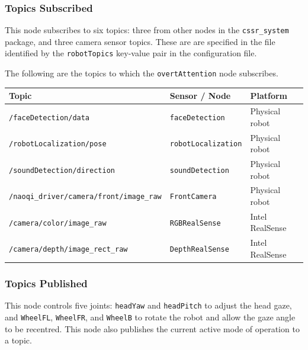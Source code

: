 \documentclass{CSSRforAfrica}
\begin{document}
{{\newpage

\subsubsection*{Topics Subscribed}
This node  subscribes to six topics:  three from other nodes in the  {\small \verb+cssr_system+} package,  and three camera sensor topics. 
These are are specified in the file identified by the {\small \verb+robotTopics+ }   key-value pair in the configuration file.

The following are the topics to which the {\small \verb+overtAttention+} node subscribes.

\begin{center}
\begin{tabularx}{\linewidth}{| l | l | X|}
\hline 
{\small Topic }                               & {\small Sensor / Node}                            &  {\small Platform}       \\
\hline
{\footnotesize \texttt{/faceDetection/data} }  & {\footnotesize \verb+faceDetection+}    & {\small Physical robot} \\ 
\hline
{\footnotesize \verb+/robotLocalization/pose+ }  & {\footnotesize \verb+robotLocalization+}    & {\small Physical robot} \\ 
\hline
{\footnotesize \texttt{/soundDetection/direction}  }  & {\footnotesize \verb+soundDetection+}    & {\small Physical robot} \\ 
\hline
{\footnotesize \verb+/naoqi_driver/camera/front/image_raw+ }  & {\footnotesize \verb+FrontCamera+}    & {\small Physical robot } \\ 
\hline
{\footnotesize \verb+/camera/color/image_raw+ }  & {\footnotesize \verb+RGBRealSense+}    & {\small Intel RealSense } \\ 
\hline
{\footnotesize \verb+/camera/depth/image_rect_raw+ }  & {\footnotesize \verb+DepthRealSense+}    & {\small Intel RealSense } \\ 
\hline
\end{tabularx}
\end{center}


\subsubsection*{Topics Published}
This node controls five joints: {\small \verb+headYaw+} and  {\small \verb+headPitch+}  to adjust the head gaze, and {\small \verb+WheelFL+},  {\small \verb+WheelFR+}, and  {\small \verb+WheelB+} to rotate the robot and allow the gaze angle to be recentred. This node also publishes the current active mode of operation to a topic.

}}
\end{document}
